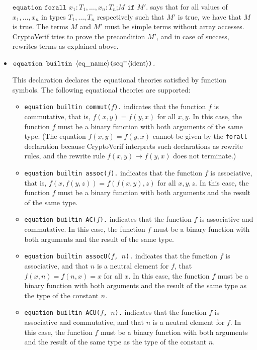 \begin{itemize}
$\texttt{equation forall }x_1:T_1, \ldots, x_n:T_n\texttt{;}M\texttt{ if }M'\texttt{.}$ says
that for all values of $x_1, \ldots, x_n$ in types $T_1, \ldots, T_n$
respectively such that $M'$ is true, we have that
$M$ is true. The terms $M$ and $M'$ must be simple terms without array accesses.
CryptoVerif tries to prove the precondition $M'$, and in case of success,
rewrites terms as explained above. 


\item $\texttt{equation builtin }\langle\textrm{eq\_name}\rangle\texttt{(}\textrm{seq}^+\langle\textrm{ident}\rangle\texttt{).}$

This declaration declares the equational theories satisfied by function symbols.
The following equational theories are supported:
\begin{itemize}

\item \texttt{equation builtin commut($f$).} indicates that the function $f$ is commutative,
that is, $f(x,y) = f(y,x)$ for all $x,y$. In this case, the function
$f$ must be a binary function with both arguments of the same type.
(The equation $f(x,y) = f(y,x)$ cannot be given by the {\tt forall}
declaration because CryptoVerif interprets such declarations as rewrite rules,
and the rewrite rule $f(x,y) \rightarrow f(y,x)$ does not terminate.)

\item \texttt{equation builtin assoc($f$).} indicates that the function $f$ is associative, that is, $f(x,f(y,z)) = f(f(x,y),z)$ for all $x,y,z$. In this case, the function $f$ must be a binary function with both arguments and the result of
the same type.

\item \texttt{equation builtin AC($f$).} indicates that the function $f$ is associative and commutative. In this case, the function $f$ must be a binary function with both arguments and the result of
the same type.

\item \texttt{equation builtin assocU($f$, $n$).} indicates that the function $f$ is associative, and that $n$ is a neutral element for $f$, that $f(x,n) = f(n,x) = x$ for all $x$. In this case, the function $f$ must be a binary function with both arguments and the result of the same type as the type of the constant $n$.

\item \texttt{equation builtin ACU($f$, $n$).} indicates that the function $f$ is associative and commutative, and that $n$ is a neutral element for $f$. In this case, the function $f$ must be a binary function with both arguments and the result of the same type as the type of the constant $n$.


\end{itemize}
\end{itemize}
